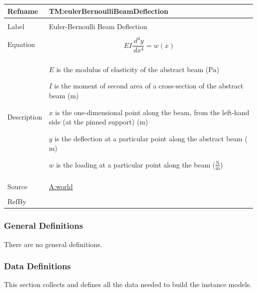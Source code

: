 \documentclass[12pt]{article}
\begin{document}
\begin{minipage}{\textwidth}
\begin{tabular}{>{\raggedright}p{}>{\raggedright\arraybackslash}p{}}
\toprule \textbf{Refname} & \textbf{TM:eulerBernoulliBeamDeflection}
\label{TM:eulerBernoulliBeamDeflection}
\\ \midrule \\
Label & Euler-Bernoulli Beam Deflection
        
\\ \midrule \\
Equation & \begin{displaymath}
           E I \frac{\,d^{4}y}{\,dx^{4}}=w\left(x\right)
           \end{displaymath}
\\ \midrule \\
Description & \begin{symbDescription}
              \item{$E$ is the modulus of elasticity of the abstract beam (${\text{Pa}}$)}
              \item{$I$ is the moment of second area of a cross-section of the abstract beam (${\text{m}}$)}
              \item{$x$ is the one-dimensional point along the beam, from the left-hand side (at the pinned support) (${\text{m}}$)}
              \item{$y$ is the deflection at a particular point along the abstract beam (${\text{m}}$)}
              \item{$w$ is the loading at a particular point along the beam ($\frac{\text{N}}{\text{m}}$)}
              \end{symbDescription}
\\ \midrule \\
Source & \hyperref[world]{A:world}
         
\\ \midrule \\
RefBy & 
\\ \bottomrule
\end{tabular}
\end{minipage}
\subsubsection{General Definitions}
\label{Sec:GDs}
There are no general definitions.

\subsubsection{Data Definitions}
\label{Sec:DDs}
This section collects and defines all the data needed to build the instance models.
\end{document}
